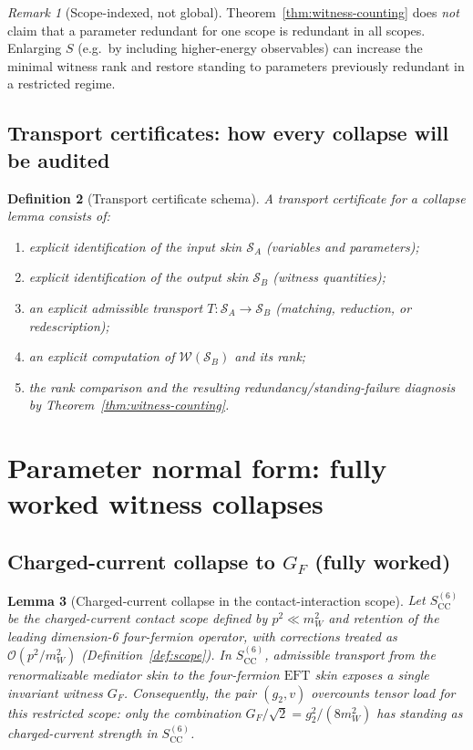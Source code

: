 \documentclass[11pt]{article}
\newtheorem{definition}{Definition}[section]
\newtheorem{lemma}[definition]{Lemma}
\theoremstyle{remark}
\newtheorem{remark}[definition]{Remark}
\newcommand{\EFT}{\ensuremath{\mathrm{EFT}}}
\newcommand{\CC}{\ensuremath{\mathrm{CC}}}
\newcommand{\cO}{\mathcal{O}}
\newcommand{\Skin}{\mathcal{S}}
\newcommand{\Wit}{\mathcal{W}}
\begin{document}
\begin{remark}[Scope-indexed, not global]\label{rem:scope-index}
Theorem~\ref{thm:witness-counting} does \emph{not} claim that a parameter redundant for one scope is
redundant in all scopes. Enlarging $S$ (e.g.\ by including higher-energy observables) can increase the
minimal witness rank and restore standing to parameters previously redundant in a restricted regime.
\end{remark}


\subsection{Transport certificates: how every collapse will be audited}

\begin{definition}[Transport certificate schema]\label{def:certificate}
A \emph{transport certificate} for a collapse lemma consists of:
\begin{enumerate}[label=(\textbf{C\arabic*}),leftmargin=2.8em]
\item explicit identification of the input skin $\Skin_A$ (variables and parameters);
\item explicit identification of the output skin $\Skin_B$ (witness quantities);
\item an explicit admissible transport $T:\Skin_A\to\Skin_B$ (matching, reduction, or redescription);
\item an explicit computation of $\Wit(\Skin_B)$ and its rank;
\item the rank comparison and the resulting redundancy/standing-failure diagnosis by
Theorem~\ref{thm:witness-counting}.
\end{enumerate}
\end{definition}

\section{Parameter normal form: fully worked witness collapses}

\subsection{Charged-current collapse to $G_F$ (fully worked)}

\begin{lemma}[Charged-current collapse in the contact-interaction scope]\label{lem:cc}
Let $S_{\CC}^{(6)}$ be the \emph{charged-current contact scope} defined by $p^2\ll m_W^2$ and retention
of the leading dimension-6 four-fermion operator, with corrections treated as
$\cO(p^2/m_W^2)$ (Definition~\ref{def:scope}).
In $S_{\CC}^{(6)}$, admissible transport from the renormalizable mediator skin to the four-fermion
$\EFT$ skin exposes a single invariant witness $G_F$. Consequently, the pair $(g_2,v)$ overcounts
tensor load for \emph{this restricted scope}: only the combination $G_F/\sqrt2=g_2^2/(8m_W^2)$ has
standing as charged-current strength in $S_{\CC}^{(6)}$.
\end{lemma}
\end{document}
